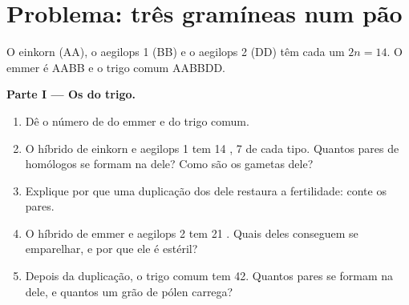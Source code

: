 \section{Problema: três gramíneas num pão}

\begin{problem}
\label{pb:g12:diversification-of-life:1}
O einkorn (AA), o aegilops 1 (BB) e o aegilops 2 (DD) têm cada um
$2n = 14$. O emmer é AABB e o trigo comum AABBDD.

\medskip
\noindent\textbf{Parte I --- Os  do trigo.}
\begin{enumerate}
  \item Dê o número de  do emmer e do trigo comum.
  \item O híbrido de einkorn e aegilops 1 tem 14 , 7 de cada
        tipo. Quantos pares de homólogos se formam na  dele? Como
        são os gametas dele?
  \item Explique por que uma duplicação dos  dele restaura a
        fertilidade: conte os pares.
  \item O híbrido de emmer e aegilops 2 tem 21 . Quais deles
        conseguem se emparelhar, e por que ele é estéril?
  \item Depois da duplicação, o trigo comum tem 42. Quantos pares se
        formam na  dele, e quantos  um grão de pólen
        carrega?
\end{enumerate}


\end{problem}
